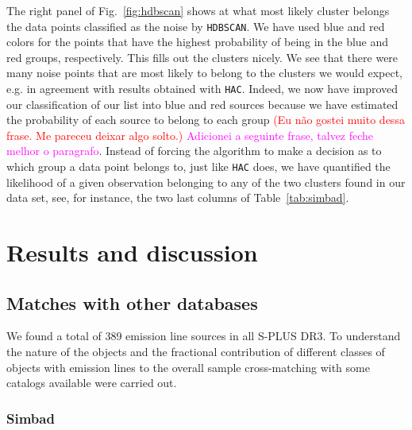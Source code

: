 \documentclass[fleqn,usenatbib]{mnras}
\newcommand{\comment}[1]{\textcolor{red}{#1}}
\newcommand{\luis}[1]{\textcolor{magenta}{#1}}
\begin{document}
The right panel of Fig.~\ref{fig:hdbscan} shows at what most likely cluster belongs the data
points classified as the noise by \texttt{HDBSCAN}. We have used blue and red colors for the
points that have the highest probability of being in the blue and red groups, respectively.
This fills out the clusters nicely. We see that there were many noise points that are most
likely to belong to the clusters we would expect, e.g. in agreement 
with 
results obtained
with \texttt{HAC}. Indeed, we now have improved our classification of our list into blue and 
red sources because we have estimated the probability of each source to belong
to each group \comment{(Eu não gostei muito dessa frase. Me pareceu deixar algo solto.)} \luis{Adicionei a seguinte frase, talvez feche melhor o paragrafo}. Instead of forcing the algorithm to make a decision as to which group a data point belongs to, just like \texttt{HAC} does, we have quantified the likelihood of a given observation belonging to any of the two clusters found in our data set, see, for instance, the two last columns of Table~\ref{tab:simbad}.  

\section{Results and discussion}
\label{sec:results}

\subsection{Matches with other databases}
\label{sec:matches}
We found a total of 389 emission line sources in all S-PLUS DR3.
To understand the nature of the objects  and the fractional
contribution of different classes of objects with emission lines
to the overall sample cross-matching with some catalogs available were carried out.

\subsubsection{Simbad}
\end{document}
